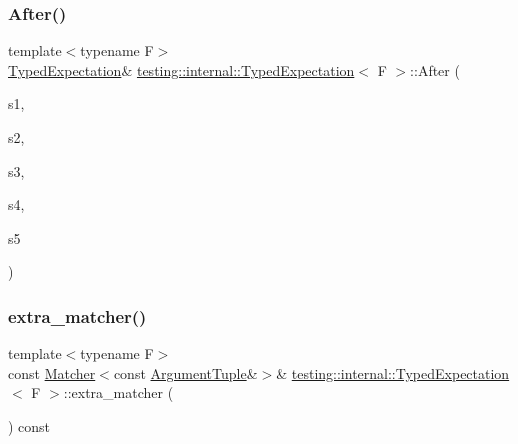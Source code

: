 \mbox{\label{classtesting_1_1internal_1_1_typed_expectation_a72c0105b147ee2995d183c8e4109f6ca}} 
\subsubsection{\texorpdfstring{After()}{After()}\hspace{0.1cm}{\footnotesize\ttfamily [5/5]}}
{\footnotesize\ttfamily template$<$typename F$>$ \\
\hyperlink{classtesting_1_1internal_1_1_typed_expectation}{Typed\+Expectation}\& \hyperlink{classtesting_1_1internal_1_1_typed_expectation}{testing\+::internal\+::\+Typed\+Expectation}$<$ F $>$\+::After (\begin{DoxyParamCaption}\item[{const \hyperlink{classtesting_1_1_expectation_set}{Expectation\+Set} \&}]{s1,  }\item[{const \hyperlink{classtesting_1_1_expectation_set}{Expectation\+Set} \&}]{s2,  }\item[{const \hyperlink{classtesting_1_1_expectation_set}{Expectation\+Set} \&}]{s3,  }\item[{const \hyperlink{classtesting_1_1_expectation_set}{Expectation\+Set} \&}]{s4,  }\item[{const \hyperlink{classtesting_1_1_expectation_set}{Expectation\+Set} \&}]{s5 }\end{DoxyParamCaption})\hspace{0.3cm}{\ttfamily [inline]}}

\mbox{\label{classtesting_1_1internal_1_1_typed_expectation_a0ee00342b872ae257cae31bc86b9a34b}} 
\subsubsection{\texorpdfstring{extra\+\_\+matcher()}{extra\_matcher()}}
{\footnotesize\ttfamily template$<$typename F$>$ \\
const \hyperlink{classtesting_1_1_matcher}{Matcher}$<$const \hyperlink{classtesting_1_1internal_1_1_typed_expectation_a9a91379262d101f435809ba4556d14fa}{Argument\+Tuple}\&$>$\& \hyperlink{classtesting_1_1internal_1_1_typed_expectation}{testing\+::internal\+::\+Typed\+Expectation}$<$ F $>$\+::extra\+\_\+matcher (\begin{DoxyParamCaption}{ }\end{DoxyParamCaption}) const\hspace{0.3cm}{\ttfamily [inline]}}

